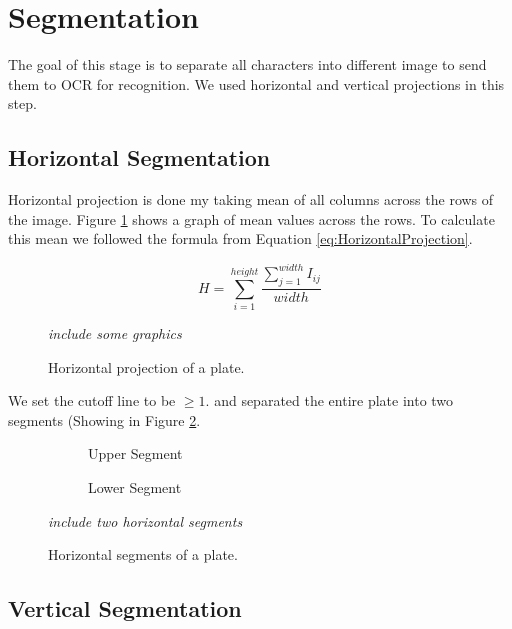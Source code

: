 \documentclass{standalone}
\begin{document}
\section{Segmentation}
The goal of this stage is to separate all characters into different image to send them to OCR for recognition. We used horizontal and vertical projections in this step.


\subsection{Horizontal Segmentation}
Horizontal projection is done my taking mean of all columns across the rows of the image. Figure \ref{fig:HorizontalProjection} shows a graph of mean values across the rows. To calculate this mean we followed the formula from Equation \ref{eq:HorizontalProjection}.

\begin{equation} \label{eq:HorizontalProjection}
H = \sum^{height}_{i=1}{\dfrac{ \sum^{width}_{j=1}{ I_{ij} } }{ width } }
\end{equation}

\begin{figure}
\centering
{\it include some graphics }
\caption{Horizontal projection of a plate.}
\label{fig:HorizontalProjection}
\end{figure}

We set the cutoff line to be $\geq 1$. and separated the entire plate into two segments (Showing in Figure \ref{fig:HorizontalSegments}. 

\begin{figure}
\centering
\begin{subfigure}{0.9\textwidth}
  \centering
  \caption{Upper Segment}
\end{subfigure}
\begin{subfigure}{0.9\textwidth}
  \centering
  \caption{Lower Segment}
\end{subfigure}
{\it include two horizontal segments }
\caption{Horizontal segments of a plate.}
\label{fig:HorizontalSegments}
\end{figure}




\subsection{Vertical Segmentation}
\end{document}
